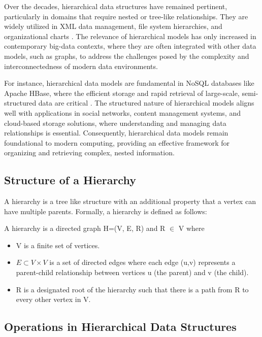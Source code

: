 Over the decades, hierarchical data structures have remained pertinent, particularly in domains that require nested or tree-like relationships. They are widely utilized in XML data management, file system hierarchies, and organizational charts \cite{DBLP:books/mk/BunemanSA99}. The relevance of hierarchical models has only increased in contemporary big-data contexts, where they are often integrated with other data models, such as graphs, to address the challenges posed by the complexity and interconnectedness of modern data environments.

For instance, hierarchical data models are fundamental in NoSQL databases like Apache HBase, where the efficient storage and rapid retrieval of large-scale, semi-structured data are critical \cite{DBLP:books/daglib/0027893}. The structured nature of hierarchical models aligns well with applications in social networks, content management systems, and cloud-based storage solutions, where understanding and managing data relationships is essential.
Consequently, hierarchical data models remain foundational to modern computing, providing an effective framework for organizing and retrieving complex, nested information.

\subsection{Structure of a Hierarchy}
A hierarchy is a tree like structure with an additional property that a vertex can have multiple parents.
Formally, a hierarchy is defined as follows:

\begin{definition}
    A hierarchy is a directed graph H=(V, E, R) and R $\in$ V where
    \begin{itemize}
        \item V is a finite set of vertices.
        \item $E \subset V \times V$ is a set of directed edges where each edge (u,v) represents a parent-child relationship between vertices u (the parent) and v (the child).
        \item R is a designated root of the hierarchy such that there is a path from R to every other vertex in V.
        
    \end{itemize} 
\end{definition}



\subsection{Operations in Hierarchical Data Structures}

